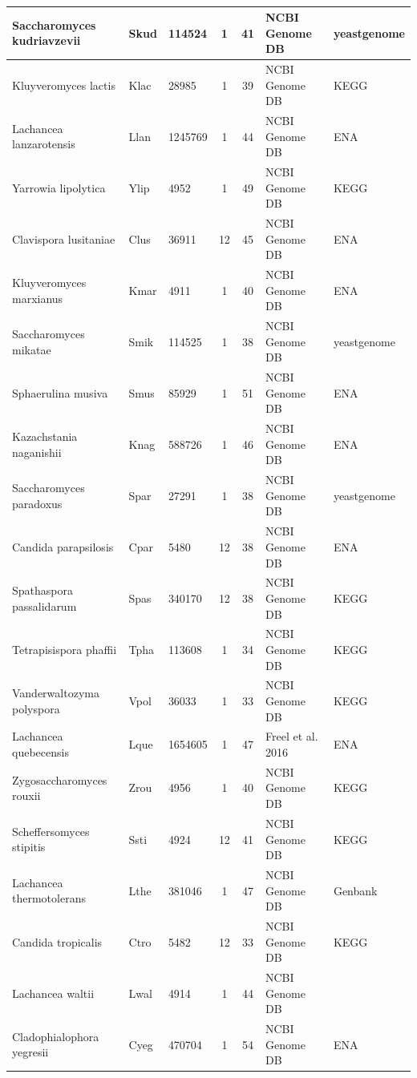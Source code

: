 \documentclass[12pt]{article}
\begin{document}
\begin{table}
\begin{tabular}{ | l | l | l | c | c | l | l | }
	Saccharomyces kudriavzevii 	& Skud 		& 114524 		&	1	& 41 	& NCBI Genome DB 	& yeastgenome \\ \hline
	Kluyveromyces lactis 		& Klac 		& 28985 		&	1	& 39 	& NCBI Genome DB 	& KEGG \\ \hline
	Lachancea lanzarotensis 	& Llan 		& 1245769 		&	1	& 44 	& NCBI Genome DB 	& ENA \\ \hline
	Yarrowia lipolytica 		& Ylip 		& 4952 			&	1	& 49 	& NCBI Genome DB 	& KEGG \\ \hline
	Clavispora lusitaniae 		& Clus 		& 36911 		&	12	& 45 	& NCBI Genome DB 	& ENA \\ \hline
	Kluyveromyces marxianus 	& Kmar 		& 4911 			&	1	& 40 	& NCBI Genome DB 	& ENA \\ \hline
	Saccharomyces mikatae 		& Smik 		& 114525 		&	1	& 38 	& NCBI Genome DB 	& yeastgenome \\ \hline
	Sphaerulina musiva 		& Smus 		& 85929 		&	1	& 51 	& NCBI Genome DB 	& ENA \\ \hline
	Kazachstania naganishii 	& Knag 		& 588726 		&	1	& 46 	& NCBI Genome DB 	& ENA \\ \hline
	Saccharomyces paradoxus 	& Spar 		& 27291 		&	1	& 38 	& NCBI Genome DB 	& yeastgenome \\ \hline
	Candida parapsilosis 		& Cpar 		& 5480 			&	12	& 38 	& NCBI Genome DB 	& ENA \\ \hline
	Spathaspora passalidarum 	& Spas 		& 340170 		&	12	& 38 	& NCBI Genome DB 	& KEGG \\ \hline
	Tetrapisispora phaffii 		& Tpha 		& 113608 		&	1	& 34 	& NCBI Genome DB 	& KEGG \\ \hline
	Vanderwaltozyma polyspora 	& Vpol 		& 36033 		&	1	& 33 	& NCBI Genome DB 	& KEGG \\ \hline
	Lachancea quebecensis 		& Lque 		& 1654605 		&	1	& 47 	& Freel et al. 2016 	& ENA \\ \hline
	Zygosaccharomyces rouxii 	& Zrou 		& 4956 			&	1	& 40 	& NCBI Genome DB 	& KEGG \\ \hline
	Scheffersomyces stipitis 	& Ssti 		& 4924 			&	12	& 41 	& NCBI Genome DB 	& KEGG \\ \hline
	Lachancea thermotolerans 	& Lthe 		& 381046 		&	1	& 47 	& NCBI Genome DB 	& Genbank \\ \hline
	Candida tropicalis 		& Ctro 		& 5482 			&	12	& 33 	& NCBI Genome DB 	& KEGG \\ \hline
	Lachancea waltii 		& Lwal 		& 4914 			&	1	& 44 	& NCBI Genome DB 	& \  \\ \hline
	Cladophialophora yegresii 	& Cyeg 		& 470704 		&	1	& 54 	& NCBI Genome DB 	& ENA \\ \hline
\end{tabular}
\caption{}
\label{tab:org_overview}
\end{table}
\end{document}
